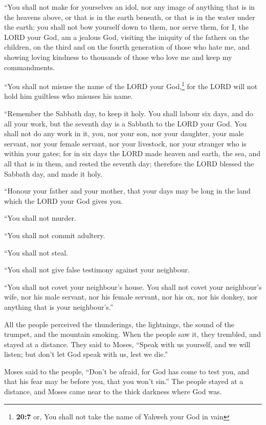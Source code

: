 ``You shall not make for yourselves an idol, nor any
image of anything that is in the heavens above, or that is in the earth
beneath, or that is in the water under the earth:  you
shall not bow yourself down to them, nor serve them, for I, the LORD
your God, am a jealous God, visiting the iniquity of the fathers on the
children, on the third and on the fourth generation of those who hate
me,  and showing loving kindness to thousands of those who
love me and keep my commandments.

 ``You shall not misuse the name of the LORD your
God,\footnote{\textbf{20:7} or, You shall not take the name of Yahweh
  your God in vain} for the LORD will not hold him guiltless who misuses
his name.

 ``Remember the Sabbath day, to keep it holy.
 You shall labour six days, and do all your work,
 but the seventh day is a Sabbath to the LORD your God.
You shall not do any work in it, you, nor your son, nor your daughter,
your male servant, nor your female servant, nor your livestock, nor your
stranger who is within your gates;  for in six days the
LORD made heaven and earth, the sea, and all that is in them, and rested
the seventh day; therefore the LORD blessed the Sabbath day, and made it
holy.

 ``Honour your father and your mother, that your days may
be long in the land which the LORD your God gives you.

 ``You shall not murder.

 ``You shall not commit adultery.

 ``You shall not steal.

 ``You shall not give false testimony against your
neighbour.

 ``You shall not covet your neighbour's house. You shall
not covet your neighbour's wife, nor his male servant, nor his female
servant, nor his ox, nor his donkey, nor anything that is your
neighbour's.''

 All the people perceived the thunderings, the
lightnings, the sound of the trumpet, and the mountain smoking. When the
people saw it, they trembled, and stayed at a distance. 
They said to Moses, ``Speak with us yourself, and we will listen; but
don't let God speak with us, lest we die.''

 Moses said to the people, ``Don't be afraid, for God has
come to test you, and that his fear may be before you, that you won't
sin.''  The people stayed at a distance, and Moses came
near to the thick darkness where God was.

